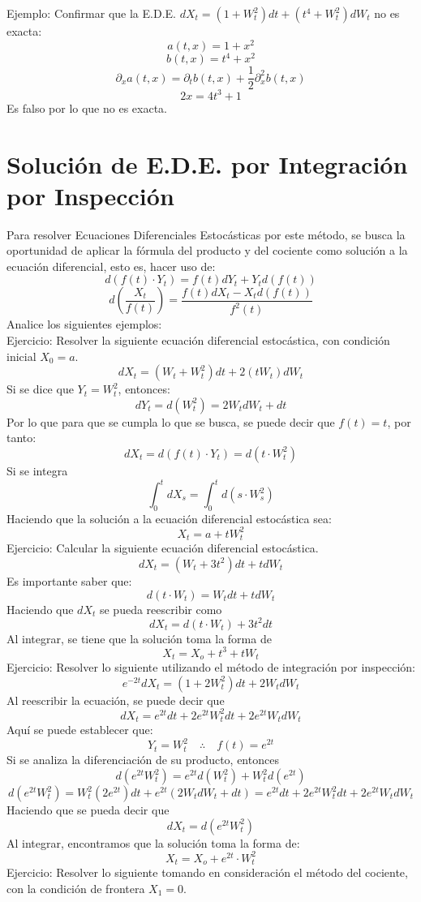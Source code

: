 \documentclass[11pt,fleqn]{book} %
\numberwithin{equation}{section} %
\numberwithin{figure}{section} %
\numberwithin{table}{section} %
\begin{document}
Ejemplo: Confirmar que la E.D.E. $dX_t=(1+W_t^2)dt+(t^4+W_t^2)dW_t$ no es exacta:
$$a(t,x)=1+x^2$$
$$b(t,x)=t^4+x^2$$
$$\partial_x a(t,x)=\partial_t b(t,x)+\frac{1}{2}\partial^2_x b(t,x)$$
$$2x=4t^3+1$$
Es falso por lo que no es exacta. 
\section{Solución de E.D.E. por Integración por Inspección}
Para resolver Ecuaciones Diferenciales Estocásticas por este método, se busca la oportunidad de aplicar la fórmula del producto y del cociente como solución a la ecuación diferencial, esto es, hacer uso de:
$$ d(f(t) \cdot Y_t) = f(t)dY_t + Y_td(f(t)) $$
$$ d\left( \frac{X_t}{f(t)}  \right) = \frac{f(t)dX_t - X_td(f(t))}{f^2(t)} $$
Analice los siguientes ejemplos:
\ \\%
Ejercicio: Resolver la siguiente ecuación diferencial estocástica, con condición inicial $X_0=a$. 
$$ dX_t = (W_t + W_t^2)dt +2(tW_t)dW_t $$
Si se dice que $Y_t=W_t^2$, entonces:
$$ dY_t = d(W_t^2) = 2W_tdW_t + dt$$
Por lo que para que se cumpla lo que se busca, se puede decir que $f(t) = t$, por tanto:
$$ dX_t = d(f(t)\cdot Y_t) =d(t \cdot W_t^2) $$
Si se integra 
$$ \int_0^{t}dX_s = \int_0^{t}d(s \cdot W_s^2) $$
Haciendo que la solución a la ecuación diferencial estocástica sea:
$$ X_t = a + tW_t^2 $$
Ejercicio: Calcular la siguiente ecuación diferencial estocástica. 
$$ dX_t = (W_t + 3t^2)dt + tdW_t $$
Es importante saber que:
$$  d(t \cdot W_t) = W_tdt + tdW_t $$
Haciendo que $dX_t$ se pueda reescribir como
$$ dX_t = d(t \cdot W_t) + 3t^2dt $$
Al integrar, se tiene que la solución toma la forma de 
$$ X_t = X_o + t^3 + tW_t $$
Ejercicio: Resolver lo siguiente utilizando el método de integración por inspección: 
$$ e^{-2t}dX_t = (1+2W_t^2)dt + 2W_tdW_t$$
Al reescribir la ecuación, se puede decir que 
$$ dX_t = e^{2t}dt + 2e^{2t}W_t^2dt +2e^{2t}W_tdW_t $$
Aquí se puede establecer que:
$$  Y_t = W_t^2 \quad \therefore \quad f(t) = e^{2t} $$
Si se analiza la diferenciación de su producto, entonces
$$ d(e^{2t}W_t^2) = e^{2t}d\left(W_t^2\right) + W_t^2d{\left( e^{2t}  \right)} $$
$$ d(e^{2t}W_t^2) = W_t^2(2e^{2t})dt + e^{2t}(2W_tdW_t + dt) = e^{2t}dt + 2e^{2t}W_t^2dt +2e^{2t}W_tdW_t $$
Haciendo que se pueda decir que 
$$ dX_t = d(e^{2t}W_t^2) $$
Al integrar, encontramos que la solución toma la forma de:
$$ X_t = X_o + e^{2t} \cdot W_t^2 $$
Ejercicio: Resolver lo siguiente tomando en consideración el método del cociente, con la condición de frontera $X_1 = 0$.
\end{document}
